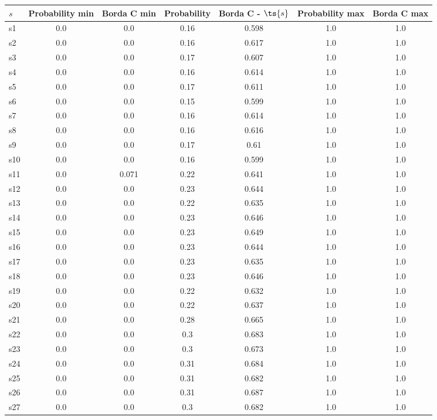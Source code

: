 \documentclass{article}
\begin{document}
\noindent\begin{tabular}{|l|c|c|c|c|c|c|}
\hline
$s$& Probability min & Borda C min & Probability & Borda C - $\ts{s}$ & Probability max & Borda C max\\
\hline
s1 &0.0 & 0.0 & 0.16 & 0.598 & 1.0 & 1.0\\
\hline
s2 &0.0 & 0.0 & 0.16 & 0.617 & 1.0 & 1.0\\
\hline
s3 &0.0 & 0.0 & 0.17 & 0.607 & 1.0 & 1.0\\
\hline
s4 &0.0 & 0.0 & 0.16 & 0.614 & 1.0 & 1.0\\
\hline
s5 &0.0 & 0.0 & 0.17 & 0.611 & 1.0 & 1.0\\
\hline
s6 &0.0 & 0.0 & 0.15 & 0.599 & 1.0 & 1.0\\
\hline
s7 &0.0 & 0.0 & 0.16 & 0.614 & 1.0 & 1.0\\
\hline
s8 &0.0 & 0.0 & 0.16 & 0.616 & 1.0 & 1.0\\
\hline
s9 &0.0 & 0.0 & 0.17 & 0.61 & 1.0 & 1.0\\
\hline
s10 &0.0 & 0.0 & 0.16 & 0.599 & 1.0 & 1.0\\
\hline
s11 &0.0 & 0.071 & 0.22 & 0.641 & 1.0 & 1.0\\
\hline
s12 &0.0 & 0.0 & 0.23 & 0.644 & 1.0 & 1.0\\
\hline
s13 &0.0 & 0.0 & 0.22 & 0.635 & 1.0 & 1.0\\
\hline
s14 &0.0 & 0.0 & 0.23 & 0.646 & 1.0 & 1.0\\
\hline
s15 &0.0 & 0.0 & 0.23 & 0.649 & 1.0 & 1.0\\
\hline
s16 &0.0 & 0.0 & 0.23 & 0.644 & 1.0 & 1.0\\
\hline
s17 &0.0 & 0.0 & 0.23 & 0.635 & 1.0 & 1.0\\
\hline
s18 &0.0 & 0.0 & 0.23 & 0.646 & 1.0 & 1.0\\
\hline
s19 &0.0 & 0.0 & 0.22 & 0.632 & 1.0 & 1.0\\
\hline
s20 &0.0 & 0.0 & 0.22 & 0.637 & 1.0 & 1.0\\
\hline
s21 &0.0 & 0.0 & 0.28 & 0.665 & 1.0 & 1.0\\
\hline
s22 &0.0 & 0.0 & 0.3 & 0.683 & 1.0 & 1.0\\
\hline
s23 &0.0 & 0.0 & 0.3 & 0.673 & 1.0 & 1.0\\
\hline
s24 &0.0 & 0.0 & 0.31 & 0.684 & 1.0 & 1.0\\
\hline
s25 &0.0 & 0.0 & 0.31 & 0.682 & 1.0 & 1.0\\
\hline
s26 &0.0 & 0.0 & 0.31 & 0.687 & 1.0 & 1.0\\
\hline
s27 &0.0 & 0.0 & 0.3 & 0.682 & 1.0 & 1.0\\

\end{tabular}
\end{document}
